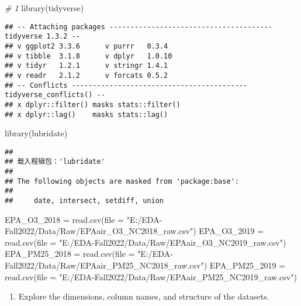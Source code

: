 \documentclass[
]{article}
\newenvironment{Shaded}{\begin{snugshade}}{\end{snugshade}}
\newcommand{\AttributeTok}[1]{\textcolor[rgb]{0.77,0.63,0.00}{#1}}
\newcommand{\CommentTok}[1]{\textcolor[rgb]{0.56,0.35,0.01}{\textit{#1}}}
\newcommand{\FunctionTok}[1]{\textcolor[rgb]{0.00,0.00,0.00}{#1}}
\newcommand{\NormalTok}[1]{#1}
\newcommand{\OtherTok}[1]{\textcolor[rgb]{0.56,0.35,0.01}{#1}}
\newcommand{\StringTok}[1]{\textcolor[rgb]{0.31,0.60,0.02}{#1}}
\providecommand{\tightlist}{%
  \setlength{\itemsep}{0pt}\setlength{\parskip}{0pt}}
\begin{document}
\begin{Shaded}
\begin{Highlighting}[]
\CommentTok{\# 1}
\FunctionTok{library}\NormalTok{(tidyverse)}
\end{Highlighting}
\end{Shaded}

\begin{verbatim}
## -- Attaching packages --------------------------------------- tidyverse 1.3.2 --
## v ggplot2 3.3.6      v purrr   0.3.4 
## v tibble  3.1.8      v dplyr   1.0.10
## v tidyr   1.2.1      v stringr 1.4.1 
## v readr   2.1.2      v forcats 0.5.2 
## -- Conflicts ------------------------------------------ tidyverse_conflicts() --
## x dplyr::filter() masks stats::filter()
## x dplyr::lag()    masks stats::lag()
\end{verbatim}

\begin{Shaded}
\begin{Highlighting}[]
\FunctionTok{library}\NormalTok{(lubridate)}
\end{Highlighting}
\end{Shaded}

\begin{verbatim}
## 
## 载入程辑包：'lubridate'
## 
## The following objects are masked from 'package:base':
## 
##     date, intersect, setdiff, union
\end{verbatim}

\begin{Shaded}
\begin{Highlighting}[]
\NormalTok{EPA\_O3\_2018 }\OtherTok{=} \FunctionTok{read.csv}\NormalTok{(}\AttributeTok{file =} \StringTok{"E:/EDA{-}Fall2022/Data/Raw/EPAair\_O3\_NC2018\_raw.csv"}\NormalTok{)}
\NormalTok{EPA\_O3\_2019 }\OtherTok{=} \FunctionTok{read.csv}\NormalTok{(}\AttributeTok{file =} \StringTok{"E:/EDA{-}Fall2022/Data/Raw/EPAair\_O3\_NC2019\_raw.csv"}\NormalTok{)}
\NormalTok{EPA\_PM25\_2018 }\OtherTok{=} \FunctionTok{read.csv}\NormalTok{(}\AttributeTok{file =} \StringTok{"E:/EDA{-}Fall2022/Data/Raw/EPAair\_PM25\_NC2018\_raw.csv"}\NormalTok{)}
\NormalTok{EPA\_PM25\_2019 }\OtherTok{=} \FunctionTok{read.csv}\NormalTok{(}\AttributeTok{file =} \StringTok{"E:/EDA{-}Fall2022/Data/Raw/EPAair\_PM25\_NC2019\_raw.csv"}\NormalTok{)}
\end{Highlighting}
\end{Shaded}

\begin{enumerate}
\def\labelenumi{\arabic{enumi}.}
\setcounter{enumi}{1}
\tightlist
\item
  Explore the dimensions, column names, and structure of the datasets.
\end{enumerate}
\end{document}
